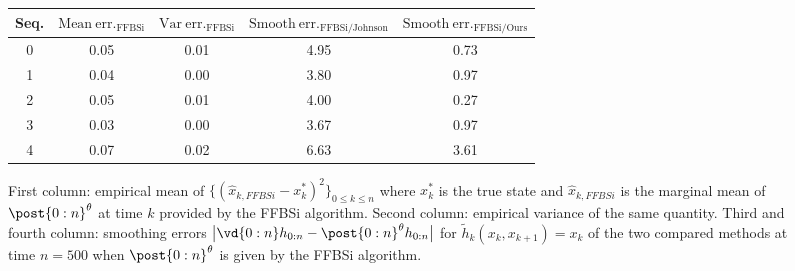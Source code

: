\documentclass{article}
\begin{document}
\begin{figure}
    \centering
    \begin{tabular}{ccccc}
        \toprule
        {Seq.} & $\mathrm{{Mean~err._{FFBSi}}}$ &   $\mathrm{{Var~err._{FFBSi}}}$ &  $\mathrm{Smooth~err._{FFBSi / Johnson}}$  &    $\mathrm{Smooth~err._{FFBSi / Ours}}$ \\
        \midrule
        0 & 0.05 & 0.01 & 4.95 & 0.73 \\
        1 & 0.04 & 0.00 & 3.80 & 0.97 \\
        2 & 0.05 & 0.01 & 4.00 & 0.27 \\
        3 & 0.03 & 0.00 & 3.67 & 0.97 \\
        4 & 0.07 & 0.02 & 6.63 & 3.61 \\
        \bottomrule
    \end{tabular}
    \caption{First column: empirical mean of $\{(\hat{x}_{k, FFBSi} - x_k^{*})^2\}_{0 \leqslant k \leqslant n}$ where $x_k^{*}$ is the true state and $\hat{x}_{k, FFBSi}$ is the marginal mean of $\post{0:n}^\parvec$ at time $k$ provided by the FFBSi algorithm. Second column: empirical variance of the same quantity. Third and fourth column: smoothing errors $\big| \vd{0:n} h_{0:n} -  \post{0:n}^{\parvec} h_{0:n} \big|$ for $\tilde{h}_{k}(x_k, x_{k+1}) = x_k$ of the two compared methods at time  $n=500$ when $\post{0:n}^\parvec$ is given by the FFBSi algorithm.}
    \label{fig:table_errors}
    \label{table:errors}

\end{figure}
\end{document}

